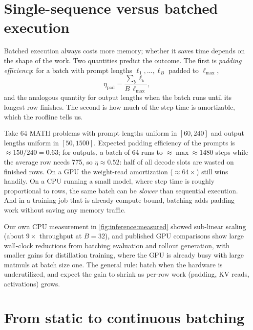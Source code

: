 \section{Single-sequence versus batched execution}\label{sec:serving:tradeoffs}

Batched execution always costs more memory; whether it saves time depends on the shape of the work.
Two quantities predict the outcome. The first is \emph{padding efficiency}: for a batch with prompt
lengths $\ell_1,\ldots,\ell_B$ padded to $\ell_{\max}$,
\begin{equation}
  \eta_{\text{pad}} = \frac{\sum_b \ell_b}{B\,\ell_{\max}},
\end{equation}
and the analogous quantity for output lengths when the batch runs until its longest row finishes.
The second is how much of the step time is amortizable, which the roofline tells us.

\begin{napkinmath}
Take 64 MATH problems with prompt lengths uniform in $[60,240]$ and output lengths uniform in
$[50,1500]$. Expected padding efficiency of the prompts is $\approx150/240=0.63$; for outputs, a batch of
64 runs to $\approx\max\approx1480$ steps while the average row needs 775, so $\eta\approx0.52$: half of
all decode slots are wasted on finished rows. On a GPU the weight-read amortization ($\approx64\times$)
still wins handily. On a CPU running a small model, where step time is roughly proportional to rows,
the same batch can be \emph{slower} than sequential execution. And in a training job that is already
compute-bound, batching adds padding work without saving any memory traffic.
\end{napkinmath}

Our own CPU measurement in \cref{fig:inference:measured} showed sub-linear scaling (about $9\times$
throughput at $B=32$), and published GPU comparisons show large wall-clock reductions from batching
evaluation and rollout generation, with smaller gains for distillation training, where the GPU is
already busy with large matmuls at batch size one. The general rule: batch when the hardware is
underutilized, and expect the gain to shrink as per-row work (padding, KV reads, activations) grows.

\section{From static to continuous batching}\label{sec:serving:continuous}

